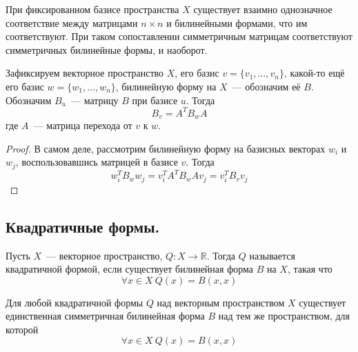 \documentclass[11pt]{report}
\begin{document}
    \begin{remark}
    При фиксированном базисе пространства $X$ существует взаимно однозначное соответствие между матрицами $n \times n$ и билинейными формами, что им соответствуют. При таком сопоставлении симметричным матрицам соответствуют симметричных билинейные формы, и наоборот.
    \end{remark}

    \vspace{15pt}

    Зафиксируем векторное пространство $X$, его базис $v = \{v_1, \hdots, v_n\}$, какой-то ещё его базис $w = \{w_1, \hdots, w_n\}$, билинейную форму на $X$~--- обозначим её $B$. Обозначим $B_u$~--- матрицу $B$ при базисе $u$. Тогда
    \begin{equation*}
        B_v = A^{T} B_w A
    \end{equation*}
    где $A$~--- матрица перехода от $v$ к $w$.

    \begin{proof}
    В самом деле, рассмотрим билинейную форму на базисных векторах $w_i$ и $w_j$, воспользовавшись матрицей в базисе $v$. Тогда
    \begin{equation*}
        w_i^{T} B_w w_j = v_{i}^{T} A^T B_w A v_j = v_{i}^{T} B_v v_{j}
    \end{equation*}
    \end{proof}

    \newpage

    \subsection{Квадратичные формы.}

    \begin{definition}
    Пусть $X$~--- векторное пространство, $Q: X \to \mathbb{R}$. Тогда $Q$ называется квадратичной формой, если существует билинейная форма $B$ на $X$, такая что
    \begin{equation*}
        \forall x \in X \ Q(x) = B(x, x)
    \end{equation*}
    \end{definition}

    \begin{theorem}
    Для любой квадратичной формы $Q$ над векторным пространством $X$ существует единственная симметричная билинейная форма $B$ над тем же пространством, для которой
    \begin{equation*}
        \forall x \in X \ Q(x) = B(x, x)
    \end{equation*}
    \end{theorem}
\end{document}
